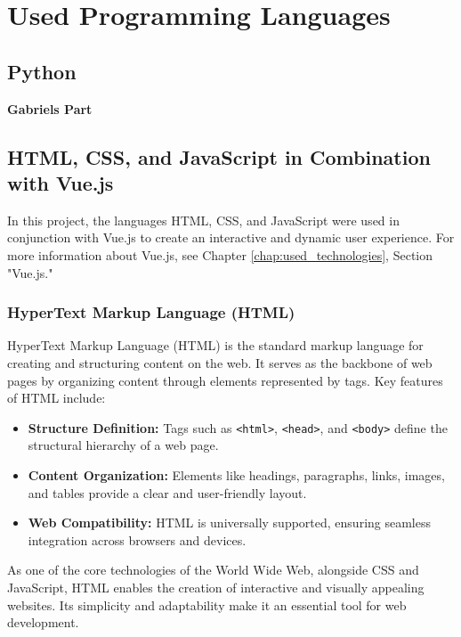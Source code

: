 
\chapter{Used Programming Languages}
\label{chap:used_programming_languages}


\section{Python}

\textbf{Gabriels Part}

\section{HTML, CSS, and JavaScript in Combination with Vue.js}

In this project, the languages HTML, CSS, and JavaScript were used in conjunction with Vue.js to create an interactive and dynamic user experience. For more information about Vue.js, see Chapter \ref{chap:used_technologies}, Section "Vue.js."

\subsection{HyperText Markup Language (HTML)}

HyperText Markup Language (HTML) is the standard markup language for creating and structuring content on the web. It serves as the backbone of web pages by organizing content through elements represented by tags. Key features of HTML include:

\begin{itemize}
    \item \textbf{Structure Definition:} Tags such as \texttt{<html>}, \texttt{<head>}, and \texttt{<body>} define the structural hierarchy of a web page.
    \item \textbf{Content Organization:} Elements like headings, paragraphs, links, images, and tables provide a clear and user-friendly layout.
    \item \textbf{Web Compatibility:} HTML is universally supported, ensuring seamless integration across browsers and devices.
\end{itemize}

As one of the core technologies of the World Wide Web, alongside CSS and JavaScript, HTML enables the creation of interactive and visually appealing websites. Its simplicity and adaptability make it an essential tool for web development.

